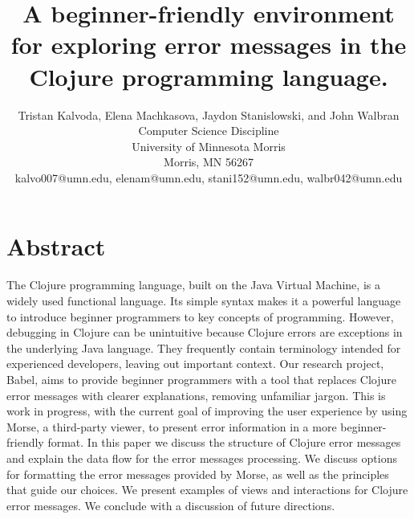 \documentclass[12pt]{article}
\newcommand{\comment}[1]{}
\begin{document}
\pagestyle{plain}
%

\title{A beginner-friendly environment for exploring error messages in the Clojure programming language.}
%
%

\author{
Tristan Kalvoda, Elena Machkasova, Jaydon Stanislowski, and John Walbran\\
Computer Science Discipline \\
University of Minnesota Morris\\
Morris, MN 56267\\
kalvo007@umn.edu, elenam@umn.edu, stani152@umn.edu, walbr042@umn.edu
}
\date{}
\maketitle
\thispagestyle{empty}

\section*{\centering Abstract}
The Clojure programming language, built on the Java Virtual Machine, is a widely used functional language. Its simple syntax makes it a powerful language to introduce beginner programmers to key concepts of programming. However, debugging in Clojure can be unintuitive because Clojure errors are exceptions in the underlying Java language. They frequently contain terminology intended for experienced developers, leaving out important context. 
Our research project, Babel, aims to provide beginner programmers with a tool that replaces Clojure error messages with clearer explanations, removing unfamiliar jargon.
This is work in progress, with the current goal of improving the user experience by using Morse, a third-party viewer, to present error information in a more beginner-friendly format.
In this paper we discuss the structure of Clojure error messages and explain the data flow for the error messages processing. We discuss options for formatting the error messages provided by Morse, as well as the principles that guide our choices. We present examples of views and interactions for Clojure error messages. We conclude with a discussion of future directions. 
\end{document}
